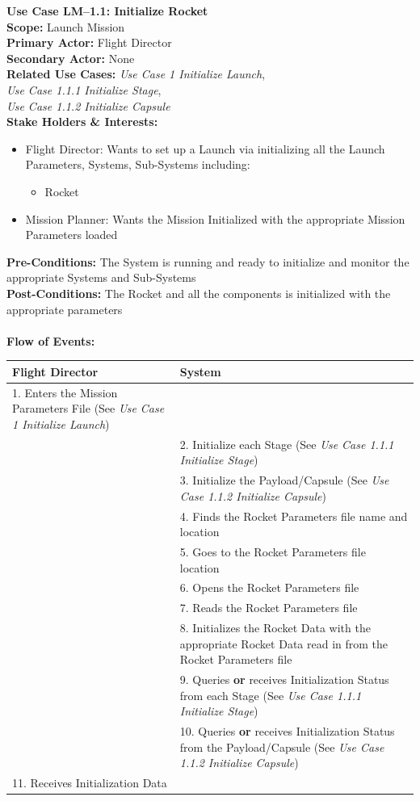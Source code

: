 \documentclass[letterpaper]{article}
\begin{document}
\noindent
\textbf{Use Case LM--1.1: Initialize Rocket}\\
\textbf{Scope: }Launch Mission\\
\textbf{Primary Actor: }Flight Director\\
\textbf{Secondary Actor:} None\\
\textbf{Related Use Cases: }\textit{Use Case 1 Initialize Launch},\\
\textit{Use Case 1.1.1 Initialize Stage},\\
\textit{Use Case 1.1.2 Initialize Capsule}\\
\textbf{Stake Holders \& Interests:}
\begin{itemize}
   \item Flight Director:  Wants to set up a Launch via initializing
      all the Launch Parameters, Systems, Sub-Systems including:
      \begin{itemize}
         \item Rocket
      \end{itemize}
   \item Mission Planner:  Wants the Mission Initialized with the
      appropriate Mission Parameters loaded
\end{itemize}
\textbf{Pre-Conditions:  }The System is running and ready to
initialize and monitor the appropriate Systems and Sub-Systems\\
\textbf{Post-Conditions:  }The Rocket and all the components is
initialized with the appropriate parameters\\\\
\textbf{Flow of Events:}\\
\begin{tabular}{|p{5.75cm}|p{5.75cm}|}\hline
   \textbf{Flight Director}&\textbf{System}\\\hline
   1.  Enters the Mission Parameters File (See 
   \textit{Use Case 1 Initialize Launch})&\\\hline
   &2. Initialize each Stage (See 
   \textit{Use Case 1.1.1 Initialize Stage})\\\hline
   &3. Initialize the Payload/Capsule (See 
   \textit{Use Case 1.1.2 Initialize Capsule})\\\hline
   &4. Finds the Rocket Parameters file name and location\\\hline
   &5. Goes to the Rocket Parameters file location\\\hline
   &6. Opens the Rocket Parameters file\\\hline
   &7. Reads the Rocket Parameters file\\\hline
   &8. Initializes the Rocket Data with the appropriate Rocket Data
   read in from the Rocket Parameters file\\\hline
   &9. Queries \textbf{or} receives Initialization Status from each
   Stage (See \textit{Use Case 1.1.1 Initialize Stage})\\\hline
   &10. Queries \textbf{or} receives Initialization Status from the
   Payload/Capsule (See 
   \textit{Use Case 1.1.2 Initialize Capsule})\\\hline
   11. Receives Initialization Data&\\\hline
\end{tabular}\\\\
\end{document}
